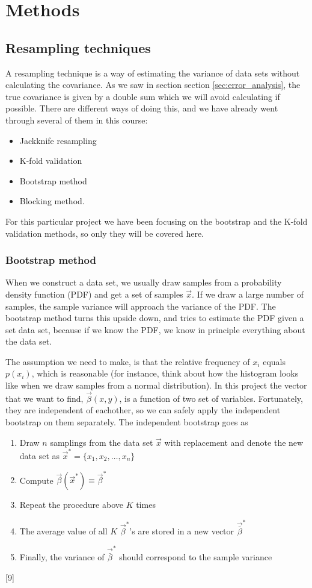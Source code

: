 \section{Methods} \label{sec:methods}

\subsection{Resampling techniques} \label{sec:resampling}
A resampling technique is a way of estimating the variance of data sets without calculating the covariance. As we saw in section section \ref{sec:error_analysis}, the true covariance is given by a double sum which we will avoid calculating if possible. There are different ways of doing this, and we have already went through several of them in this course:
\begin{itemize}
	\item{Jackknife resampling}
	\item{K-fold validation}
	\item{Bootstrap method}
	\item{Blocking method}.
\end{itemize}

For this particular project we have been focusing on the bootstrap and the K-fold validation methods, so only they will be covered here.

\subsubsection{Bootstrap method} \label{sec:bootstrap}
When we construct a data set, we usually draw samples from a probability density function (PDF) and get a set of samples $\vec{x}$. If we draw a large number of samples, the sample variance will approach the variance of the PDF. The bootstrap method turns this upside down, and tries to estimate the PDF given a set data set, because if we know the PDF, we know in principle everything about the data set. 

The assumption we need to make, is that the relative frequency of $x_i$ equals $p(x_i)$, which is reasonable (for instance, think about how the histogram looks like when we draw samples from a normal distribution). In this project the vector that we want to find, $\vec{\beta}(x,y)$, is a function of two set of variables. Fortunately, they are independent of eachother, so we can safely apply the independent bootstrap on them separately. The independent bootstrap goes as
\begin{enumerate}
	\item Draw $n$ samplings from the data set $\vec{x}$ with replacement and denote the new data set as $\vec{x}^*=\{x_1,x_2,\hdots,x_n\}$
	\item Compute $\vec{\beta}(\vec{x}^*)\equiv\vec{\beta}^*$
	\item Repeat the procedure above $K$ times
	\item The average value of all $K$ $\vec{\beta}^*$'s are stored in a new vector $\vec{\bar{\beta}}^*$
	\item Finally, the variance of $\vec{\bar{\beta}}^*$ should correspond to the sample variance
\end{enumerate}
[9]


